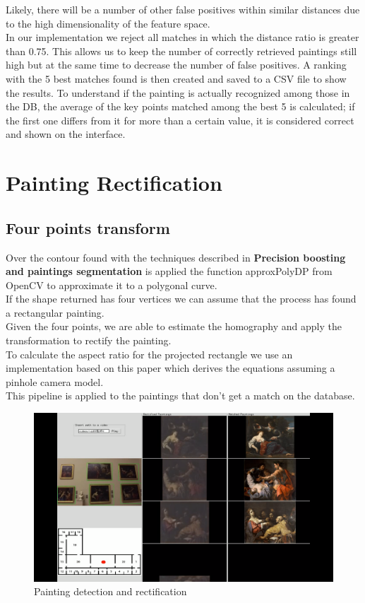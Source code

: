\documentclass[conference]{IEEEtran}
\begin{document}
Likely, there will be a number of other false positives within similar distances due to the high dimensionality of the feature space.\\
In our implementation we reject all matches in which the distance ratio is greater than 0.75.
This allows us to keep the number of correctly retrieved paintings still high but at the same time to decrease the number of false positives.
A ranking with the 5 best matches found is then created and saved to a CSV file to show the results.
To understand if the painting is actually recognized among those in the DB, the average of the key points matched among the best 5 is calculated; if the first one differs from it for more than a certain value, it is considered correct and shown on the interface.\\


\section{Painting Rectification}
\subsection{Four points transform}
Over the contour found with the techniques described in \textbf{Precision boosting and paintings segmentation} is applied the function approxPolyDP from OpenCV to approximate it to a polygonal curve.\\
If the shape returned has four vertices we can assume that the process has found a rectangular painting.\\
Given the four points, we are able to estimate the homography and apply the transformation to rectify the painting.\\
To calculate the aspect ratio for the projected rectangle we use an implementation based on this paper \cite{b10} which derives the equations assuming a pinhole camera model.\\
This pipeline is applied to the paintings that don't get a match on the database.

\begin{figure}[htbp]
\centerline{\includegraphics[width=0.8\columnwidth]{../detection_and_rectification/top_association_vid05.png}}
\caption{Painting detection and rectification}
\label{fig_Painting_detection_and_rectification}
\end{figure}
\end{document}

